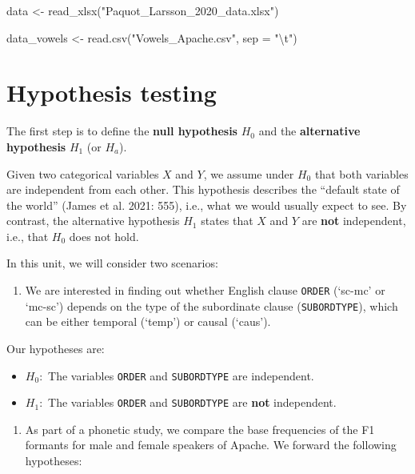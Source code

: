 \documentclass[
  11pt,
  letterpaper,
  DIV=11,
  numbers=noendperiod]{scrreprt}
\newenvironment{Shaded}{\begin{snugshade}}{\end{snugshade}}
\newcommand{\AttributeTok}[1]{\textcolor[rgb]{0.40,0.45,0.13}{#1}}
\newcommand{\FunctionTok}[1]{\textcolor[rgb]{0.28,0.35,0.67}{#1}}
\newcommand{\NormalTok}[1]{\textcolor[rgb]{0.00,0.23,0.31}{#1}}
\newcommand{\OtherTok}[1]{\textcolor[rgb]{0.00,0.23,0.31}{#1}}
\newcommand{\SpecialCharTok}[1]{\textcolor[rgb]{0.37,0.37,0.37}{#1}}
\newcommand{\StringTok}[1]{\textcolor[rgb]{0.13,0.47,0.30}{#1}}
\providecommand{\tightlist}{%
  \setlength{\itemsep}{0pt}\setlength{\parskip}{0pt}}\usepackage{longtable,booktabs,array}
\begin{document}
\begin{Shaded}
\begin{Highlighting}[]
\NormalTok{data }\OtherTok{\textless{}{-}} \FunctionTok{read\_xlsx}\NormalTok{(}\StringTok{"Paquot\_Larsson\_2020\_data.xlsx"}\NormalTok{)}

\NormalTok{data\_vowels }\OtherTok{\textless{}{-}} \FunctionTok{read.csv}\NormalTok{(}\StringTok{"Vowels\_Apache.csv"}\NormalTok{, }\AttributeTok{sep =} \StringTok{"}\SpecialCharTok{\textbackslash{}t}\StringTok{"}\NormalTok{)}
\end{Highlighting}
\end{Shaded}

\section{Hypothesis testing}\label{hypothesis-testing-1}

The first step is to define the \textbf{null hypothesis} \(H_0\) and the
\textbf{alternative hypothesis} \(H_1\) (or \(H_a\)).

Given two categorical variables \(X\) and \(Y\), we assume under \(H_0\)
that both variables are independent from each other. This hypothesis
describes the ``default state of the world'' (James et al. 2021: 555),
i.e., what we would usually expect to see. By contrast, the alternative
hypothesis \(H_1\) states that \(X\) and \(Y\) are \textbf{not}
independent, i.e., that \(H_0\) does not hold.

In this unit, we will consider two scenarios:

\begin{enumerate}
\def\labelenumi{\arabic{enumi}.}
\tightlist
\item
  We are interested in finding out whether English clause \texttt{ORDER}
  (`sc-mc' or `mc-sc') depends on the type of the subordinate clause
  (\texttt{SUBORDTYPE}), which can be either temporal (`temp') or causal
  (`caus').
\end{enumerate}

Our hypotheses are:

\begin{itemize}
\item
  \(H_0:\) The variables \texttt{ORDER} and \texttt{SUBORDTYPE} are
  independent.
\item
  \(H_1:\) The variables \texttt{ORDER} and \texttt{SUBORDTYPE} are
  \textbf{not} independent.
\end{itemize}

\begin{enumerate}
\def\labelenumi{\arabic{enumi}.}
\setcounter{enumi}{1}
\tightlist
\item
  As part of a phonetic study, we compare the base frequencies of the F1
  formants for male and female speakers of Apache. We forward the
  following hypotheses:
\end{enumerate}
\end{document}
